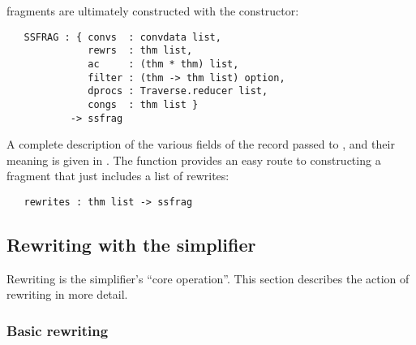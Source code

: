 {\Simpset{} fragments are ultimately constructed with the 
constructor:
\begin{hol}
\begin{verbatim}
   SSFRAG : { convs  : convdata list,
              rewrs  : thm list,
              ac     : (thm * thm) list,
              filter : (thm -> thm list) option,
              dprocs : Traverse.reducer list,
              congs  : thm list }
           -> ssfrag
\end{verbatim}
\end{hol}
A complete description of the various fields of the record passed to
, and their meaning is given in \REFERENCE.  The
 function provides an easy route to constructing a
fragment that just includes a list of rewrites:
\begin{hol}
\begin{verbatim}
   rewrites : thm list -> ssfrag
\end{verbatim}
\end{hol}

\subsection{Rewriting with the simplifier}
\label{sec:simplifier-rewriting}

Rewriting is the simplifier's ``core operation''.  This section
describes the action of rewriting in more detail.


\subsubsection{Basic rewriting}
\label{sec:basic-rewriting}

}
